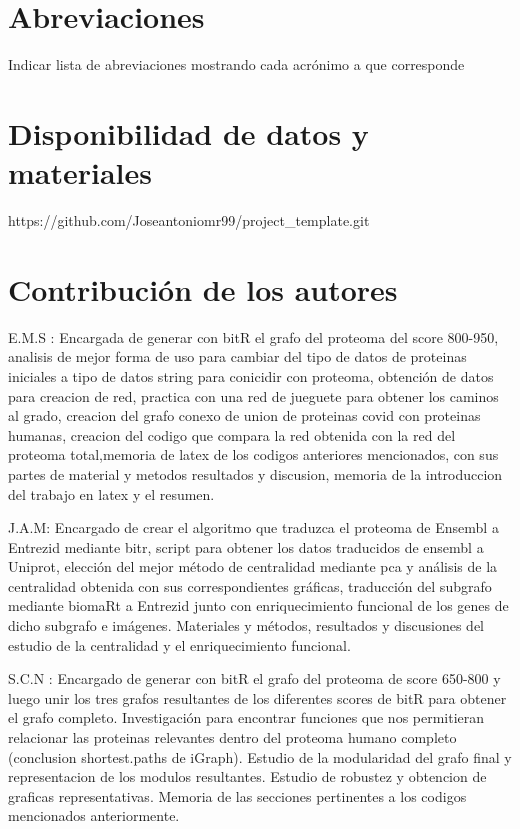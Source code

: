 \documentclass{bmcart}
\begin{document}
	\begin{backmatter}
	
		\section*{Abreviaciones}%
			Indicar lista de abreviaciones mostrando cada acrónimo a que corresponde
		
		\section*{Disponibilidad de datos y materiales}%
			https://github.com/Joseantoniomr99/project\_template.git
		
		\section*{Contribución de los autores}
			E.M.S : Encargada de generar con bitR el grafo del proteoma del score 800-950, analisis de mejor forma de uso para cambiar del tipo de 
			datos de proteinas iniciales a tipo de datos string para conicidir con proteoma, obtención de datos para creacion de red, 
			practica con una red de jueguete para obtener los caminos al grado, creacion del grafo conexo de union de proteinas covid con proteinas 
			humanas, creacion del codigo que compara la red obtenida con la red del proteoma total,memoria de latex de los codigos
			anteriores mencionados, con sus partes de material y metodos resultados y discusion, memoria de la introduccion del trabajo en latex 
			y el resumen.
			
			J.A.M: Encargado de crear el algoritmo que traduzca el proteoma de Ensembl a Entrezid mediante bitr, script para obtener los datos traducidos de ensembl 			 a Uniprot, elecci\'on del mejor m\'etodo de centralidad mediante pca y an\'alisis de la centralidad obtenida con sus correspondientes gr\'aficas, 				traducci\'on del subgrafo mediante biomaRt a Entrezid junto con enriquecimiento funcional de los genes de dicho subgrafo e im\'agenes. Materiales y 				m\'etodos, resultados y discusiones del estudio de la centralidad y el enriquecimiento funcional.
			
			S.C.N : Encargado de generar con bitR el grafo del proteoma de score 650-800 y luego unir los tres grafos resultantes de los diferentes 
			scores de bitR para obtener el grafo completo. Investigación para encontrar funciones que nos permitieran relacionar las proteinas 
			relevantes dentro del proteoma humano completo (conclusion shortest.paths de iGraph). 
			Estudio de la modularidad del grafo final y representacion de los modulos resultantes. Estudio de robustez y obtencion de graficas representativas.
			Memoria de las secciones pertinentes a los codigos mencionados anteriormente.
		

\end{backmatter}
\end{document}
